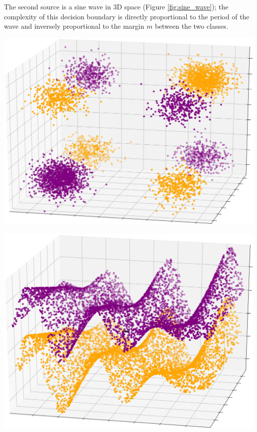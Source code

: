 \documentclass{article}
\begin{document}
The second source is a sine wave in 3D space (Figure \ref{fig:sine_wave}); the
complexity of this decision boundary is directly proportional to the period of
the wave and inversely proportional to the margin $m$ between the two classes.

\begin{minipage}{\textwidth}
\begin{minipage}{.48\textwidth}
    \centering
    \includegraphics[width=\textwidth]{xor_3d_square.png}
    \label{fig:xor}
\end{minipage}
\hspace{.04\textwidth}
\begin{minipage}{.48\textwidth}
    \centering
    \includegraphics[width=\textwidth]{sine_wave_square.png}
    \label{fig:sine_wave}
\end{minipage}
\end{minipage}
\end{document}
